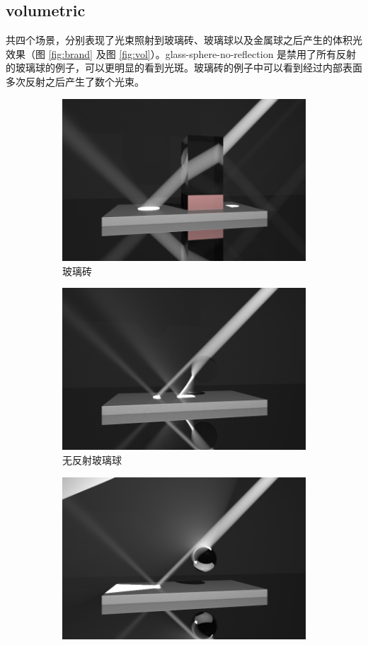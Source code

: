 \documentclass{ctexart}
\begin{document}
\subsection{volumetric}
共四个场景，分别表现了光束照射到玻璃砖、玻璃球以及金属球之后产生的体积光效果（图 \ref{fig:brand} 及图 \ref{fig:vol}）。glass-sphere-no-reflection 是禁用了所有反射的玻璃球的例子，可以更明显的看到光斑。玻璃砖的例子中可以看到经过内部表面多次反射之后产生了数个光束。

\begin{figure}[ht]
  \centering
  \begin{subfigure}{.3\textwidth}
    \centering
    \includegraphics[width=.8\linewidth]{final/volumetric/block.png}
    \caption{玻璃砖}
  \end{subfigure}
  \begin{subfigure}{.3\textwidth}
    \centering
    \includegraphics[width=.8\linewidth]{final/volumetric/glass-sphere-no-reflection.png}
    \caption{无反射玻璃球}
  \end{subfigure}
  \begin{subfigure}{.3\textwidth}
    \centering
    \includegraphics[width=.8\linewidth]{final/volumetric/metal-sphere.png}

\end{subfigure}
\end{figure}
\end{document}
